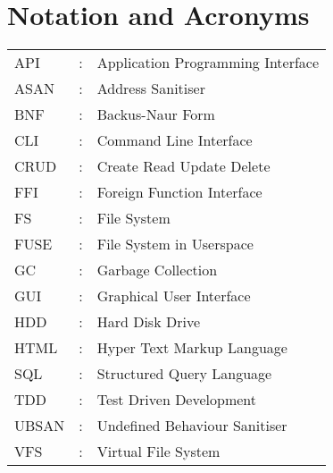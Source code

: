 \chapter*{Notation and Acronyms}
\vspace{1cm}

\noindent
\begin{tabular}{lcl}
    API &: & Application Programming Interface \\
    ASAN &: & Address Sanitiser \\
    BNF &: & Backus-Naur Form \\
    CLI &: & Command Line Interface \\
    CRUD &: & Create Read Update Delete \\
    FFI &: & Foreign Function Interface \\
    FS &: & File System \\
    FUSE &: & File System in Userspace \\
    GC &: & Garbage Collection \\
    GUI &: & Graphical User Interface \\
    HDD &: & Hard Disk Drive \\
    HTML &: & Hyper Text Markup Language \\
    SQL &: & Structured Query Language \\
    TDD &: & Test Driven Development \\
    UBSAN &: & Undefined Behaviour Sanitiser \\
    VFS &: & Virtual File System \\
\end{tabular}
